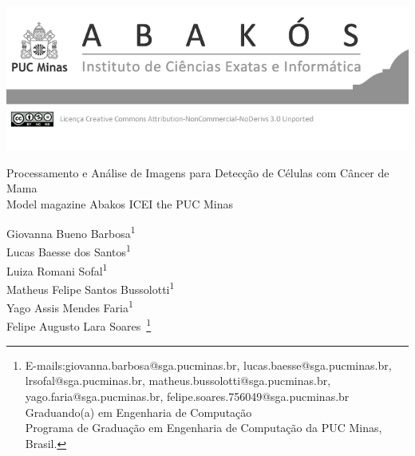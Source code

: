 \documentclass[a4paper,12pt,Times]{article}
\makeatletter
\newcommand{\monog}{Processamento e Análise de Imagens para Detecção de Células com Câncer de Mama}
\newcommand{\monogES}{Model magazine Abakos ICEI the PUC Minas}
\newcommand{\origem}{Brasil}
\newcommand{\AutorA}{Giovanna Bueno Barbosa\textsuperscript{1}}
\newcommand{\EmailA}{giovanna.barbosa@sga.pucminas.br}
\newcommand{\AutorB}{Lucas Baesse dos Santos\textsuperscript{1}}
\newcommand{\EmailB}{lucas.baesse@sga.pucminas.br}
\newcommand{\AutorC}{Luiza Romani Sofal\textsuperscript{1}}
\newcommand{\EmailC}{lrsofal@sga.pucminas.br}
\newcommand{\AutorD}{Matheus Felipe Santos Bussolotti\textsuperscript{1}}
\newcommand{\EmailD}{matheus.bussolotti@sga.pucminas.br}
\newcommand{\AutorE}{Yago Assis Mendes Faria\textsuperscript{1}}
\newcommand{\EmailE}{yago.faria@sga.pucminas.br}
\newcommand{\AutorF}{Felipe Augusto Lara Soares}
\newcommand{\EmailF}{felipe.soares.756049@sga.pucminas.br}
\newcommand{\Funcao}{Graduando(a) em Engenharia de Computação}
\newcommand{\Curso}{Programa de Graduação em Engenharia de Computação da PUC Minas}
\makeatother
\begin{document}

\begin{flushleft}

\begin{minipage} [c][5cm][b]{16.5cm} %
\includegraphics[scale=2.8]{figuras/pucmg.png} 
\end{minipage}

 \vspace{0cm} {
 \singlespacing \Large{\monog {} \\ }
  \normalsize{\monogES}
 }
\end{flushleft}
\begin{flushright}
\singlespacing 


\normalsize{\AutorA \\ \AutorB \\ \AutorC \\ \AutorD \\ \AutorE \\ \AutorF\ \footnote{E-mails:\EmailA, \EmailB, \EmailC, \EmailD, \EmailE, \EmailF \\  \Funcao \\ \Curso, \origem.}} 

\end{flushright}
\thispagestyle{empty}
\end{document}
